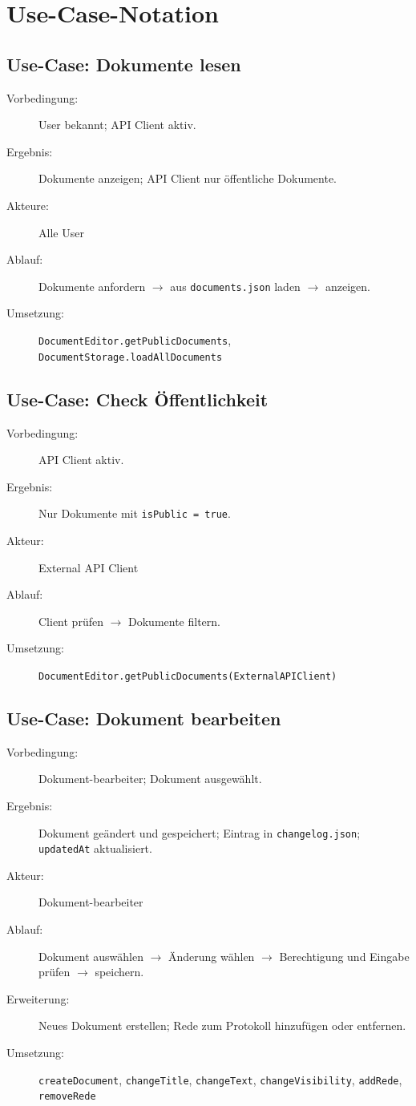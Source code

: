 \section{Use-Case-Notation}


\subsection{Use-Case: Dokumente lesen}
\begin{description}
    \item[Vorbedingung:] User bekannt; API Client aktiv.
    \item[Ergebnis:] Dokumente anzeigen; API Client nur öffentliche Dokumente.
    \item[Akteure:] Alle User
    \item[Ablauf:] Dokumente anfordern $\rightarrow$ aus \texttt{documents.json} laden $\rightarrow$ anzeigen.
    \item[Umsetzung:] \texttt{DocumentEditor.getPublicDocuments}, \texttt{DocumentStorage.loadAllDocuments}
\end{description}

\subsection{Use-Case: Check Öffentlichkeit}
\begin{description}
    \item[Vorbedingung:] API Client aktiv.
    \item[Ergebnis:] Nur Dokumente mit \texttt{isPublic = true}.
    \item[Akteur:] External API Client
    \item[Ablauf:] Client prüfen $\rightarrow$ Dokumente filtern.
    \item[Umsetzung:] \texttt{DocumentEditor.getPublicDocuments(ExternalAPIClient)}
\end{description}

\subsection{Use-Case: Dokument bearbeiten}
\begin{description}
    \item[Vorbedingung:] Dokument-bearbeiter; Dokument ausgewählt.
    \item[Ergebnis:] Dokument geändert und gespeichert; Eintrag in \texttt{changelog.json}; \texttt{updatedAt} aktualisiert.
    \item[Akteur:] Dokument-bearbeiter
    \item[Ablauf:] Dokument auswählen $\rightarrow$ Änderung wählen $\rightarrow$ Berechtigung und Eingabe prüfen $\rightarrow$ speichern.
    \item[Erweiterung:] Neues Dokument erstellen; Rede zum Protokoll hinzufügen oder entfernen.
    \item[Umsetzung:] \texttt{createDocument}, \texttt{changeTitle}, \texttt{changeText}, \texttt{changeVisibility}, \texttt{addRede}, \texttt{removeRede}
\end{description}

